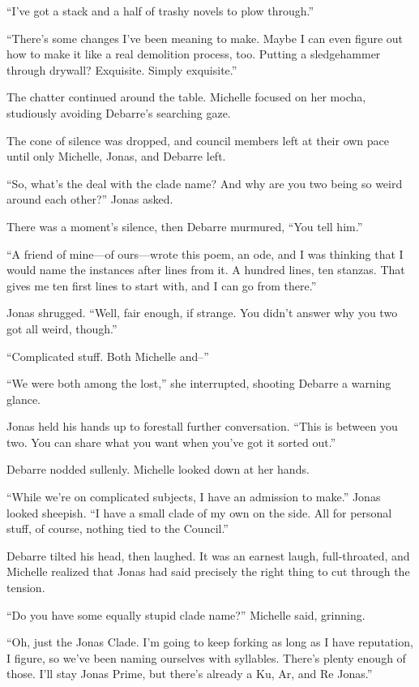 ``I've got a stack and a half of trashy novels to plow through.''

``There's some changes I've been meaning to make. Maybe I can even figure out how to make it like a real demolition process, too. Putting a sledgehammer through drywall? Exquisite. Simply exquisite.''

The chatter continued around the table. Michelle focused on her mocha, studiously avoiding Debarre's searching gaze.

The cone of silence was dropped, and council members left at their own pace until only Michelle, Jonas, and Debarre left.

``So, what's the deal with the clade name? And why are you two being so weird around each other?'' Jonas asked.

There was a moment's silence, then Debarre murmured, ``You tell him.''

``A friend of mine---of ours---wrote this poem, an ode, and I was thinking that I would name the instances after lines from it. A hundred lines, ten stanzas. That gives me ten first lines to start with, and I can go from there.''

Jonas shrugged. ``Well, fair enough, if strange. You didn't answer why you two got all weird, though.''

``Complicated stuff. Both Michelle and--''

``We were both among the lost,'' she interrupted, shooting Debarre a warning glance.

Jonas held his hands up to forestall further conversation. ``This is between you two. You can share what you want when you've got it sorted out.''

Debarre nodded sullenly. Michelle looked down at her hands.

``While we're on complicated subjects, I have an admission to make.'' Jonas looked sheepish. ``I have a small clade of my own on the side. All for personal stuff, of course, nothing tied to the Council.''

Debarre tilted his head, then laughed. It was an earnest laugh, full-throated, and Michelle realized that Jonas had said precisely the right thing to cut through the tension.

``Do you have some equally stupid clade name?'' Michelle said, grinning.

``Oh, just the Jonas Clade. I'm going to keep forking as long as I have reputation, I figure, so we've been naming ourselves with syllables. There's plenty enough of those. I'll stay Jonas Prime, but there's already a Ku, Ar, and Re Jonas.''

